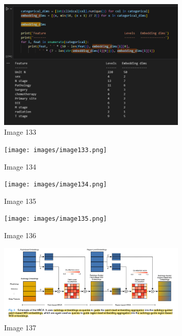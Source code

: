 \documentclass{article}%
\begin{document}
%


\begin{figure}[h!]%
\centering%
\includegraphics[width=0.8\textwidth]{images/image132.png}%
\caption{Image 133}%
\end{figure}

%


\begin{figure}[h!]%
\centering%
\texttt{[image: images/image133.png]}%
\caption{Image 134}%
\end{figure}

%


\begin{figure}[h!]%
\centering%
\texttt{[image: images/image134.png]}%
\caption{Image 135}%
\end{figure}

%


\begin{figure}[h!]%
\centering%
\texttt{[image: images/image135.png]}%
\caption{Image 136}%
\end{figure}

%


\begin{figure}[h!]%
\centering%
\includegraphics[width=0.8\textwidth]{images/image136.png}%
\caption{Image 137}%
\end{figure}

%
\end{document}

